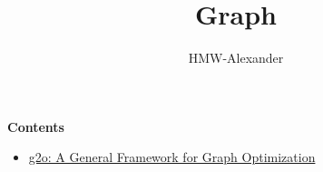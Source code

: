 \documentclass[letterpaper,11pt]{article}
\title{\textbf{Graph }}
\author{HMW-Alexander}
\begin{document}
\maketitle

\textbf{Contents}
\begin{itemize}
	\item \href{./g2o_A_General_Framework_for_Graph_Optimization/document.html}{g2o: A General Framework for Graph Optimization}
\end{itemize}
	
\end{document}
